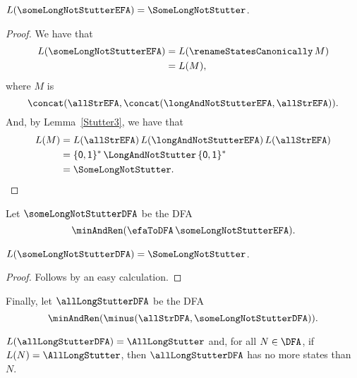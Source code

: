 \begin{lemma}
\label{Stutter10}
$L(\someLongNotStutterEFA) = \SomeLongNotStutter$.
\end{lemma}

\begin{proof}
We have that
\begin{align*}
L(\someLongNotStutterEFA) &= L(\renameStatesCanonically\,M) \\
&= L(M) ,
\end{align*}
where $M$ is
\begin{displaymath}
\concat(\allStrEFA,\concat(\longAndNotStutterEFA,\allStrEFA)) .
\end{displaymath}
And, by Lemma~\ref{Stutter3}, we have that
\begin{align*}
L(M) &= L(\allStrEFA)\,L(\longAndNotStutterEFA)\,L(\allStrEFA) \\
     &= \{\mathsf{0,1}\}^*\,\LongAndNotStutter\,\{\mathsf{0,1}\}^* \\
     &= \SomeLongNotStutter .
\end{align*}
\end{proof}

Let $\someLongNotStutterDFA$ be the DFA
\begin{displaymath}
\minAndRen(\efaToDFA\,\someLongNotStutterEFA) .
\end{displaymath}

\begin{lemma}
\label{Stutter11}
$L(\someLongNotStutterDFA) = \SomeLongNotStutter$.
\end{lemma}

\begin{proof}
Follows by an easy calculation.
\end{proof}

Finally, let $\allLongStutterDFA$ be the DFA
\begin{displaymath}
\minAndRen(\minus(\allStrDFA, \someLongNotStutterDFA)) .
\end{displaymath}

\begin{lemma}
\label{Stutter12}
$L(\allLongStutterDFA) = \AllLongStutter$ and,
for all $N\in\DFA$, if $L(N)=\AllLongStutter$,
then $\allLongStutterDFA$ has no more states than $N$.
\end{lemma}

